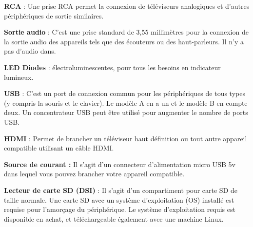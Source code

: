 \documentclass[12pt,a4paper]{report}
\begin{document}
\noindent \textbf{RCA }: Une prise RCA permet la connexion de t\'{e}l\'{e}viseurs analogiques et d'autres p\'{e}riph\'{e}riques de sortie similaires.

\noindent \begin{flushleft}
	
\end{flushleft}

\noindent \textbf{Sortie audio }: C'est une prise standard de 3,55 millim\`{e}tres pour la connexion de la sortie audio des appareils tels que des \'{e}couteurs ou des haut-parleurs. Il n'y a pas d'audio dans.

\noindent \begin{flushleft}
	
\end{flushleft}

\noindent \textbf{LED Diodes }: \'{e}lectroluminescentes, pour tous les besoins en indicateur lumineux.

\noindent \begin{flushleft}
	
\end{flushleft}

\noindent \textbf{USB }: C'est un port de connexion commun pour les p\'{e}riph\'{e}riques de tous types (y compris la souris et le clavier). Le mod\`{e}le A en a un et le mod\`{e}le B en compte deux. Un concentrateur USB peut \^{e}tre utilis\'{e} pour augmenter le nombre de ports USB.

\noindent \begin{flushleft}
	
\end{flushleft}

\noindent \textbf{HDMI }: Permet de brancher un t\'{e}l\'{e}viseur haut d\'{e}finition ou tout autre appareil compatible utilisant un c\^{a}ble HDMI.

\noindent \begin{flushleft}
	
\end{flushleft}

\noindent \textbf{Source de courant : }Il s'agit d'un connecteur d'alimentation micro USB 5v dans lequel vous pouvez brancher votre appareil compatible.

\noindent \begin{flushleft}
	
\end{flushleft}

\noindent \textbf{Lecteur de carte SD (DSI) }: Il s'agit d'un compartiment pour carte SD de taille normale. Une carte SD avec un syst\`{e}me d'exploitation (OS) install\'{e} est requise pour l'amor\c{c}age du p\'{e}riph\'{e}rique. Le syst\`{e}me d'exploitation requis est disponible en achat, et t\'{e}l\'{e}chargeable \'{e}galement avec une machine Linux.
\end{document}
